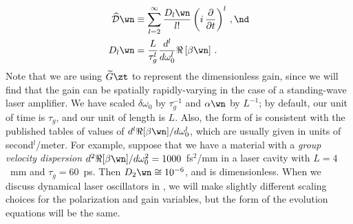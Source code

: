 \begin{subequations}
  \begin{align}
    \label{eqn:cw_sml_disp_op}
    \widehat{\mathcal{D}}\wn &\equiv \sum_{l = 2}^\infty \frac{D_l\wn}{l!} \left(i\, \frac{\partial}{\partial t}\right)^l\, , \nd \\
    \label{eqn:cw_sml_disp_coeff}
    D_l\wn &= \frac{L}{\tau_g^l} \frac{d^l}{d \omega_0^l} \Re\left[\beta\wn\right]\, .
  \end{align}
\end{subequations}
Note that we are using $\widetilde{G}\zt$ to represent the dimensionless gain, since we will find that the gain can be spatially rapidly-varying in the case of a standing-wave laser amplifier. We have scaled $\delta \omega_0$ by $\tau_g^{-1}$ and $\alpha\wn$ by $L^{-1}$; by default, our unit of time is $\tau_g$, and our unit of length is $L$. Also, the form of  is consistent with the published tables of values of $d^l \Re[\beta\wn] / d \omega_0^l$, which are usually given in units of second$^l$/meter. For example, suppose that we have a material with a \emph{group velocity dispersion} $d^2 \Re[\beta\wn] / d \omega_0^2 = 1000$~fs$^2$/mm in a laser cavity with $L = 4$~mm and $\tau_g = 60$~ps. Then $D_2\wn \cong 10^{-6}$, and is dimensionless. When we discuss dynamical laser oscillators in , we will make slightly different scaling choices for the polarization and gain variables, but the form of the evolution equations will be the same.

